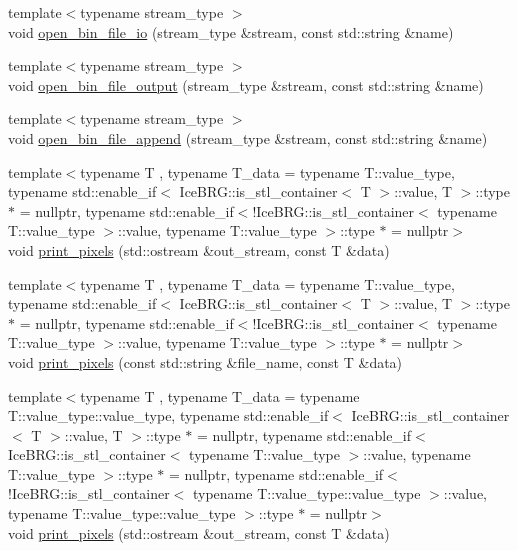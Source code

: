 \begin{DoxyCompactItemize}
\item 
{\footnotesize template$<$typename stream\-\_\-type $>$ }\\void \hyperlink{namespaceIceBRG_a309c9817a7e278ce46a00c29ab30eb60}{open\-\_\-bin\-\_\-file\-\_\-io} (stream\-\_\-type \&stream, const std\-::string \&name)
\item 
{\footnotesize template$<$typename stream\-\_\-type $>$ }\\void \hyperlink{namespaceIceBRG_aaa8c8a1d592d139f48c5c18f94774dfd}{open\-\_\-bin\-\_\-file\-\_\-output} (stream\-\_\-type \&stream, const std\-::string \&name)
\item 
{\footnotesize template$<$typename stream\-\_\-type $>$ }\\void \hyperlink{namespaceIceBRG_afce33e7856f705bb3b736e29d4dcf5c6}{open\-\_\-bin\-\_\-file\-\_\-append} (stream\-\_\-type \&stream, const std\-::string \&name)
\item 
{\footnotesize template$<$typename T , typename T\-\_\-data  = typename T\-::value\-\_\-type, typename std\-::enable\-\_\-if$<$ Ice\-B\-R\-G\-::is\-\_\-stl\-\_\-container$<$ T $>$\-::value, T $>$\-::type $\ast$  = nullptr, typename std\-::enable\-\_\-if$<$!\-Ice\-B\-R\-G\-::is\-\_\-stl\-\_\-container$<$ typename T\-::value\-\_\-type $>$\-::value, typename T\-::value\-\_\-type $>$\-::type $\ast$  = nullptr$>$ }\\void \hyperlink{namespaceIceBRG_a4f6b170fb120d0d143532edc551443d0}{print\-\_\-pixels} (std\-::ostream \&out\-\_\-stream, const T \&data)
\item 
{\footnotesize template$<$typename T , typename T\-\_\-data  = typename T\-::value\-\_\-type, typename std\-::enable\-\_\-if$<$ Ice\-B\-R\-G\-::is\-\_\-stl\-\_\-container$<$ T $>$\-::value, T $>$\-::type $\ast$  = nullptr, typename std\-::enable\-\_\-if$<$!\-Ice\-B\-R\-G\-::is\-\_\-stl\-\_\-container$<$ typename T\-::value\-\_\-type $>$\-::value, typename T\-::value\-\_\-type $>$\-::type $\ast$  = nullptr$>$ }\\void \hyperlink{namespaceIceBRG_ac6dc2cd6e8dd4c94975f19c502decb62}{print\-\_\-pixels} (const std\-::string \&file\-\_\-name, const T \&data)
\item 
{\footnotesize template$<$typename T , typename T\-\_\-data  = typename T\-::value\-\_\-type\-::value\-\_\-type, typename std\-::enable\-\_\-if$<$ Ice\-B\-R\-G\-::is\-\_\-stl\-\_\-container$<$ T $>$\-::value, T $>$\-::type $\ast$  = nullptr, typename std\-::enable\-\_\-if$<$ Ice\-B\-R\-G\-::is\-\_\-stl\-\_\-container$<$ typename T\-::value\-\_\-type $>$\-::value, typename T\-::value\-\_\-type $>$\-::type $\ast$  = nullptr, typename std\-::enable\-\_\-if$<$!\-Ice\-B\-R\-G\-::is\-\_\-stl\-\_\-container$<$ typename T\-::value\-\_\-type\-::value\-\_\-type $>$\-::value, typename T\-::value\-\_\-type\-::value\-\_\-type $>$\-::type $\ast$  = nullptr$>$ }\\void \hyperlink{namespaceIceBRG_a6f81451b445822cf2de4e3e9063e2784}{print\-\_\-pixels} (std\-::ostream \&out\-\_\-stream, const T \&data)

\end{DoxyCompactItemize}
